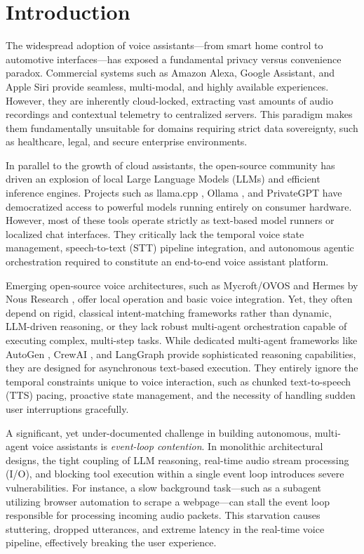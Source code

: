 \documentclass[conference]{IEEEtran}
\begin{document}
\section{Introduction}

The widespread adoption of voice assistants---from smart home control to automotive interfaces---has exposed a fundamental privacy versus convenience paradox. Commercial systems such as Amazon Alexa, Google Assistant, and Apple Siri provide seamless, multi-modal, and highly available experiences. However, they are inherently cloud-locked, extracting vast amounts of audio recordings and contextual telemetry to centralized servers. This paradigm makes them fundamentally unsuitable for domains requiring strict data sovereignty, such as healthcare, legal, and secure enterprise environments.

In parallel to the growth of cloud assistants, the open-source community has driven an explosion of local Large Language Models (LLMs) and efficient inference engines. Projects such as llama.cpp \cite{gerganov2023llamacpp}, Ollama \cite{ollama2023}, and PrivateGPT \cite{privategpt2023} have democratized access to powerful models running entirely on consumer hardware. However, most of these tools operate strictly as text-based model runners or localized chat interfaces. They critically lack the temporal voice state management, speech-to-text (STT) pipeline integration, and autonomous agentic orchestration required to constitute an end-to-end voice assistant platform.

Emerging open-source voice architectures, such as Mycroft/OVOS \cite{mycroft} and Hermes by Nous Research \cite{noushermes}, offer local operation and basic voice integration. Yet, they often depend on rigid, classical intent-matching frameworks rather than dynamic, LLM-driven reasoning, or they lack robust multi-agent orchestration capable of executing complex, multi-step tasks. While dedicated multi-agent frameworks like AutoGen \cite{wu2023autogen}, CrewAI \cite{crewai}, and LangGraph \cite{langgraph} provide sophisticated reasoning capabilities, they are designed for asynchronous text-based execution. They entirely ignore the temporal constraints unique to voice interaction, such as chunked text-to-speech (TTS) pacing, proactive state management, and the necessity of handling sudden user interruptions gracefully.

A significant, yet under-documented challenge in building autonomous, multi-agent voice assistants is \textit{event-loop contention}. In monolithic architectural designs, the tight coupling of LLM reasoning, real-time audio stream processing (I/O), and blocking tool execution within a single event loop introduces severe vulnerabilities. For instance, a slow background task---such as a subagent utilizing browser automation to scrape a webpage---can stall the event loop responsible for processing incoming audio packets. This starvation causes stuttering, dropped utterances, and extreme latency in the real-time voice pipeline, effectively breaking the user experience.
\end{document}
